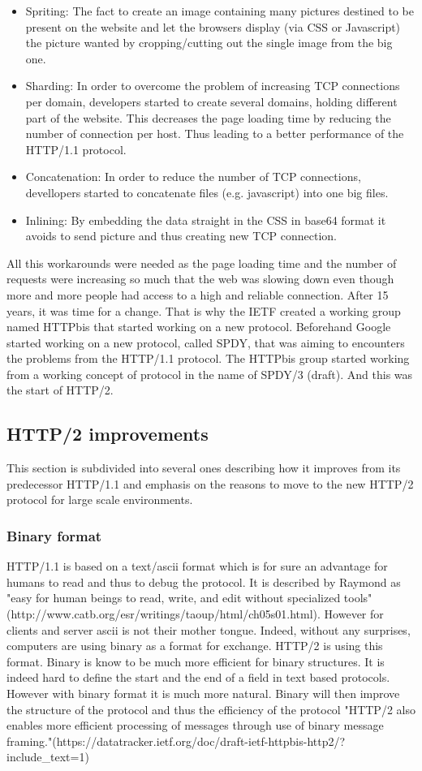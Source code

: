 \begin{itemize}
\item Spriting: The fact to create an image containing many pictures destined to be present on the website and let the browsers display (via CSS or Javascript) the picture wanted by cropping/cutting out the single image from the big one.
\item Sharding: In order to overcome the problem of increasing TCP connections per domain, developers started to create several domains, holding different part of the website. This decreases the page loading time by reducing the number of connection per host. Thus leading to a better performance of the HTTP/1.1 protocol.
\item Concatenation: In order to reduce the number of TCP connections, devellopers started to concatenate files (e.g. javascript) into one big files. 
\item Inlining: By embedding the data straight in the CSS in base64 format it avoids to send picture and thus creating new TCP connection. 
\end{itemize}
All this workarounds were needed as the page loading time and the number of requests were increasing so much that the web was slowing down even though more and more people had access to a high and reliable connection. After 15 years, it was time for a change. That is why the IETF created a working group named HTTPbis that started working on a new protocol. Beforehand Google started working on a new protocol, called SPDY, that was aiming to encounters the problems from the HTTP/1.1 protocol. The HTTPbis group started working from a working concept of protocol in the name of SPDY/3 (draft). And this was the start of HTTP/2.

\subsection{HTTP/2 improvements}
This section is subdivided into several ones describing how it improves from its predecessor HTTP/1.1 and emphasis on the reasons to move to the new HTTP/2 protocol for large scale environments. 
\subsubsection{Binary format}
HTTP/1.1 is based on a text/ascii format which is for sure an advantage for humans to read and thus to debug the protocol. It is described by Raymond as "easy for human beings to read, write, and edit without specialized tools"(http://www.catb.org/esr/writings/taoup/html/ch05s01.html). However for clients and server ascii is not their mother tongue. Indeed, without any surprises, computers are using binary as a format for exchange. HTTP/2 is using this format.
Binary is know to be much more efficient for binary structures. It is indeed hard to define the start and the end of a field in text based protocols. However with binary format it is much more natural. Binary will then improve the structure of the protocol and thus the efficiency of the protocol "HTTP/2 also enables more efficient processing of messages through use of binary message framing."(https://datatracker.ietf.org/doc/draft-ietf-httpbis-http2/?include\_text=1)

